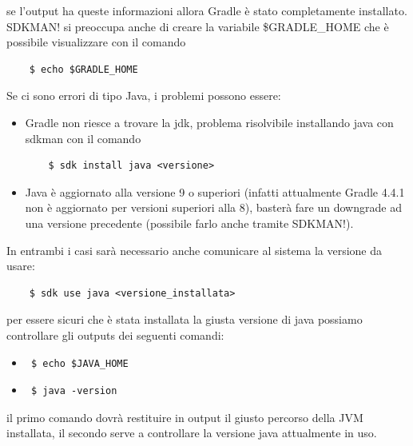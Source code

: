 se l'output ha queste informazioni allora Gradle è stato completamente installato. SDKMAN! si preoccupa anche di creare la variabile \$GRADLE\_HOME che è possibile visualizzare con il comando 
\begin{verbatim} 
    $ echo $GRADLE_HOME \end{verbatim} 
Se ci sono errori di tipo Java, i problemi possono essere:
\begin{itemize}
  \item Gradle non riesce a trovare la jdk, problema risolvibile installando java con sdkman con il comando 
  \begin{verbatim}
    $ sdk install java <versione>  \end{verbatim}
  \item Java è aggiornato alla versione 9 o superiori (infatti attualmente Gradle 4.4.1 non è aggiornato per versioni superiori alla 8), basterà fare un downgrade ad una versione precedente (possibile farlo anche tramite SDKMAN!).
\end{itemize}
In entrambi i casi sarà necessario anche comunicare al sistema la versione da usare: 
\begin{verbatim}  
    $ sdk use java <versione_installata> \end{verbatim} 
per essere sicuri che è stata installata la giusta versione di java possiamo controllare gli outputs dei seguenti comandi:
\begin{itemize}
  \item 
  \begin{verbatim} $ echo $JAVA_HOME \end{verbatim}
  \item \begin{verbatim} $ java -version \end{verbatim}
\end{itemize}
il primo comando dovrà restituire in output il giusto percorso della JVM installata, il secondo serve a controllare la versione java attualmente in uso.

